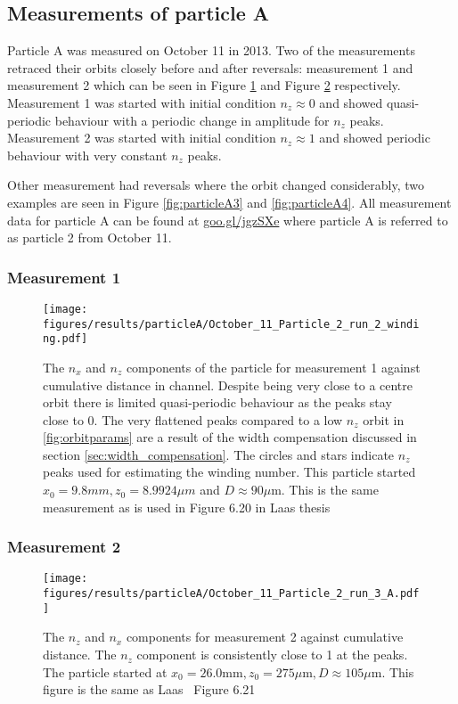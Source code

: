 \subsection{Measurements of particle A}
Particle A was measured on October 11 in 2013. Two of the measurements retraced their orbits closely before and after reversals: measurement 1 and measurement 2 which can be seen in Figure \ref{fig:particleA1} and Figure \ref{fig:particleA2} respectively. Measurement 1 was started with initial condition $n_z \approx 0$ and showed quasi-periodic behaviour with a periodic change in amplitude for $n_z$ peaks. Measurement 2 was started with initial condition $n_z \approx 1$ and showed periodic behaviour with very constant $n_z$ peaks. 

Other measurement had reversals where the orbit changed considerably, two examples are seen in Figure \ref{fig:particleA3} and \ref{fig:particleA4}. All measurement data for particle A can be found at \url{goo.gl/jgzSXe} where particle A is referred to as particle 2 from October 11. 


\subsubsection{Measurement 1}
\begin{figure}[H]
\begin{center}
\texttt{[image: figures/results/particleA/October\_11\_Particle\_2\_run\_2\_winding.pdf]}
\end{center}
\caption{The $n_x$ and $n_z$ components of the particle for measurement 1 against cumulative distance in channel. Despite being very close to a centre orbit there is limited quasi-periodic behaviour as the peaks stay close to 0. The very flattened peaks compared to a low $n_z$ orbit in \ref{fig:orbitparams} are a result of the width compensation discussed in section \ref{sec:width_compensation}.  The circles and stars indicate $n_z$ peaks used for estimating the winding number. This particle started $x_0 = 9.8 mm, z_0 = 8.9924 \mu m$ and $D \approx 90\mu$m. This is the same measurement as is used in Figure 6.20 in Laas thesis~\cite{alexanderThesis}}
\label{fig:particleA1}
\end{figure}


\subsubsection{Measurement 2}
\begin{figure}[H]
\begin{center}
\texttt{[image: figures/results/particleA/October\_11\_Particle\_2\_run\_3\_A.pdf]}
\end{center}
\caption{The $n_z$ and $n_x$ components for measurement 2 against cumulative distance. The $n_z$ component is consistently close to 1 at the peaks. 
The particle started at $ x_0 = 26.0 \text{mm}, z_0 = 275\mu\text{m}, D\approx 105\mu$m. This figure is the same as Laas~\cite{alexanderThesis} Figure 6.21}
\label{fig:particleA2}
\end{figure}


